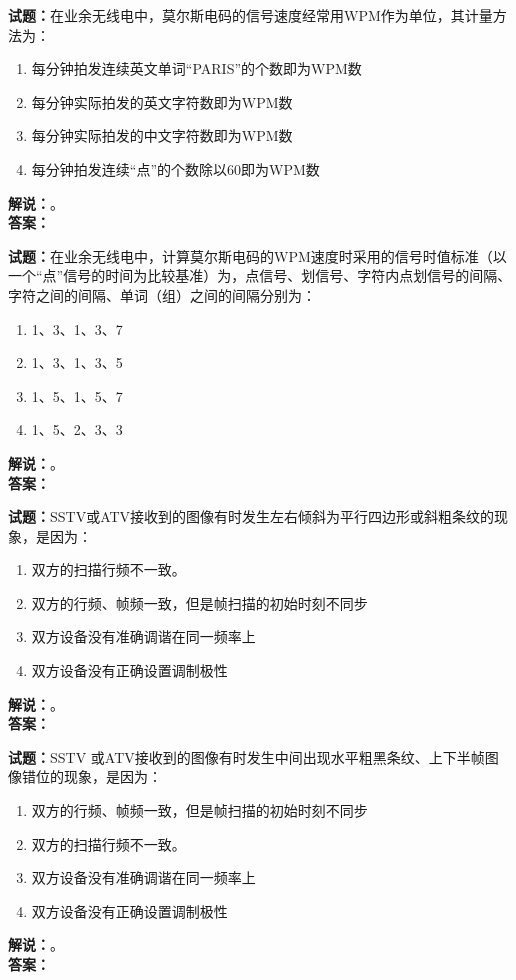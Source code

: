 \documentclass{ctexbook}
\begin{document}
\vspace{\baselineskip}

\noindent\textbf{试题：}在业余无线电中，莫尔斯电码的信号速度经常用WPM作为单位，其计量方法为：
\begin{enumerate}[leftmargin=3em]
  \item 每分钟拍发连续英文单词“PARIS”的个数即为WPM数
  \item 每分钟实际拍发的英文字符数即为WPM数
  \item 每分钟实际拍发的中文字符数即为WPM数
  \item 每分钟拍发连续“点”的个数除以60即为WPM数
\end{enumerate}
\noindent\textbf{解说：}\textbf{}。\\\noindent\textbf{答案：}

\vspace{\baselineskip}

\noindent\textbf{试题：}在业余无线电中，计算莫尔斯电码的WPM速度时采用的信号时值标准（以一个“点”信号的时间为比较基准）为，点信号、划信号、字符内点划信号的间隔、字符之间的间隔、单词（组）之间的间隔分别为：
\begin{enumerate}[leftmargin=3em]
  \item 1、3、1、3、7
  \item 1、3、1、3、5
  \item 1、5、1、5、7
  \item 1、5、2、3、3
\end{enumerate}
\noindent\textbf{解说：}\textbf{}。\\\noindent\textbf{答案：}

\vspace{\baselineskip}

\noindent\textbf{试题：}SSTV或ATV接收到的图像有时发生左右倾斜为平行四边形或斜粗条纹的现象，是因为：
\begin{enumerate}[leftmargin=3em]
  \item 双方的扫描行频不一致。
  \item 双方的行频、帧频一致，但是帧扫描的初始时刻不同步
  \item 双方设备没有准确调谐在同一频率上
  \item 双方设备没有正确设置调制极性
\end{enumerate}
\noindent\textbf{解说：}\textbf{}。\\\noindent\textbf{答案：}

\vspace{\baselineskip}

\noindent\textbf{试题：}SSTV 或ATV接收到的图像有时发生中间出现水平粗黑条纹、上下半帧图像错位的现象，是因为：
\begin{enumerate}[leftmargin=3em]
  \item 双方的行频、帧频一致，但是帧扫描的初始时刻不同步
  \item 双方的扫描行频不一致。
  \item 双方设备没有准确调谐在同一频率上
  \item 双方设备没有正确设置调制极性
\end{enumerate}
\noindent\textbf{解说：}\textbf{}。\\\noindent\textbf{答案：}
\end{document}
